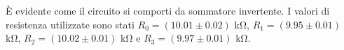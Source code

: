 È evidente come il circuito si comporti da sommatore invertente. I valori di resistenza utilizzate sono stati $R_0=(10.01\pm0.02)$ \si{\kilo\ohm}, $R_1=(9.95\pm0.01)$ \si{\kilo\ohm}, $R_2=(10.02\pm 0.01)$ \si{\kilo\ohm} e $R_3=(9.97\pm0.01)$ \si{\kilo\ohm}. \phantom{xxxxxxxxxxxxxxxxxxxxxxxxxxxxxxxxxxxxxxxx}
